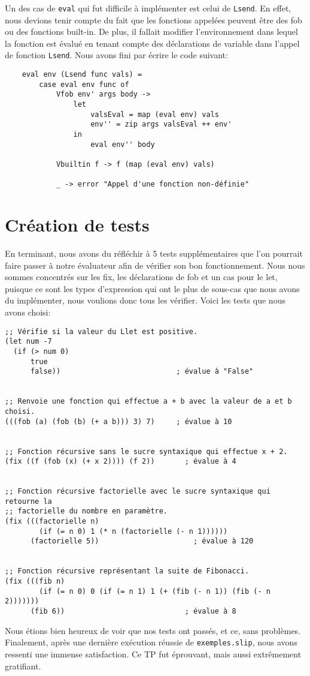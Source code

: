 \documentclass{article}
\begin{document}
\noindent Un des cas de \texttt{eval} qui fut difficile à implémenter est celui de \texttt{Lsend}. En effet, nous devions tenir compte du fait que les fonctions appelées peuvent être des fob ou des fonctions built-in. De plus, il fallait modifier l'environnement dans lequel la fonction est évalué en tenant compte des déclarations de variable dans l'appel de fonction \texttt{Lsend}. Nous avons fini par écrire le code suivant:
{\footnotesize
\begin{verbatim}
    eval env (Lsend func vals) =
        case eval env func of
            Vfob env' args body ->
                let 
                    valsEval = map (eval env) vals
                    env'' = zip args valsEval ++ env'
                in 
                    eval env'' body
    
            Vbuiltin f -> f (map (eval env) vals)
    
            _ -> error "Appel d'une fonction non-définie"
\end{verbatim}
}
\section{Création de tests}
En terminant, nous avons du réfléchir à 5 tests supplémentaires que l'on pourrait faire passer à notre évaluateur afin de vérifier son bon fonctionnement. Nous nous sommes concentrés sur les fix, les déclarations de fob et un cas pour le let, puisque ce sont les types d'expression qui ont le plus de sous-cas que nous avons du implémenter, nous voulions donc tous les vérifier. Voici les tests que nous avons choisi:
{\footnotesize
\begin{verbatim}
;; Vérifie si la valeur du Llet est positive.
(let num -7
  (if (> num 0)
      true
      false))                           ; évalue à "False"


;; Renvoie une fonction qui effectue a + b avec la valeur de a et b choisi.
(((fob (a) (fob (b) (+ a b))) 3) 7)     ; évalue à 10


;; Fonction récursive sans le sucre syntaxique qui effectue x + 2.
(fix ((f (fob (x) (+ x 2)))) (f 2))       ; évalue à 4


;; Fonction récursive factorielle avec le sucre syntaxique qui retourne la 
;; factorielle du nombre en paramètre.
(fix (((factorielle n)
        (if (= n 0) 1 (* n (factorielle (- n 1))))))
      (factorielle 5))                      ; évalue à 120


;; Fonction récursive représentant la suite de Fibonacci.
(fix (((fib n)
        (if (= n 0) 0 (if (= n 1) 1 (+ (fib (- n 1)) (fib (- n 2)))))))
      (fib 6))                            ; évalue à 8
\end{verbatim}
}
\noindent Nous étions bien heureux de voir que nos tests ont passés, et ce, sans problèmes. Finalement, après une dernière exécution réussie de \texttt{exemples.slip}, nous avons ressenti une immense satisfaction. Ce TP fut éprouvant, mais aussi extrêmement gratifiant.
\end{document}
